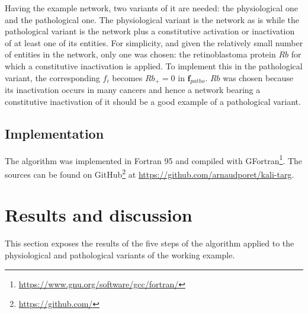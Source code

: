 \documentclass[oneside,a4paper,onecolumn,notitlepage]{article}
\begin{document}
Having the example network, two variants of it are needed: the physiological one and the pathological one. The physiological variant is the network as is while the pathological variant is the network plus a constitutive activation or inactivation of at least one of its entities. For simplicity, and given the relatively small number of entities in the network, only one was chosen: the retinoblastoma protein $Rb$ for which a constitutive inactivation is applied. To implement this in the pathological variant, the corresponding $f_i$ becomes $Rb_{+}=0$ in $\boldsymbol{f}_{patho}$.
$Rb$ was chosen because its inactivation occurs in many cancers \cite{sherr2002rb} and hence a network bearing a constitutive inactivation of it should be a good example of a pathological variant.

\subsection{Implementation}
The algorithm was implemented in Fortran 95 and compiled with GFortran\footnote{\url{https://www.gnu.org/software/gcc/fortran/}}. The sources can be found on GitHub\footnote{\url{https://github.com/}} at \url{https://github.com/arnaudporet/kali-targ}.

\section{Results and discussion}
This section exposes the results of the five steps of the algorithm applied to the physiological and pathological variants of the working example.
\end{document}
